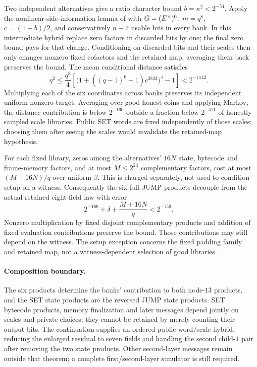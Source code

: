 \documentclass[11pt]{article}
\begin{document}
Two independent alternatives give a ratio character bound $b=\kappa^2<2^{-54}$. Apply the nonlinear-side-information lemma of  with $G=(E^\times)^6$, $m=q^8$, $c=(1+b)/2$, and conservatively $n-7$ usable bits in every bank. In this intermediate hybrid replace zero factors in discarded bits by one; the final zero bound pays for that change. Conditioning on discarded bits and their scales then only changes nonzero fixed cofactors and the retained map; averaging them back preserves the bound. The mean conditional distance satisfies
\[
 \eta^2\le\frac{q^8}{4}
 \left[\bigl(1+((q-1)^6-1)c^{3833}\bigr)^4-1\right]
 <2^{-1142}.
\]
Multiplying each of the six coordinates across banks preserves its independent uniform nonzero target. Averaging over good honest coins and applying Markov, the distance contribution is below $2^{-160}$ outside a fraction below $2^{-411}$ of honestly sampled scale libraries. Public SET words are fixed independently of those scales; choosing them after seeing the scales would invalidate the retained-map hypothesis.

For each fixed library, zeros among the alternatives' $16N$ state, bytecode and frame-memory factors, and at most $M\le2^{24}$ complementary factors, cost at most $(M+16N)/q$ over uniform $\beta$. This is charged separately, not used to condition setup on a witness. Consequently the six full JUMP products decouple from the actual retained eight-field law with error
\[
 2^{-160}+\delta+\frac{M+16N}{q}<2^{-159}.
\]
Nonzero multiplication by fixed disjoint complementary products and addition of fixed evaluation contributions preserve the bound. Those contributions may still depend on the witness. The setup exception concerns the fixed padding family and retained map, not a witness-dependent selection of good libraries.

\paragraph{Composition boundary.} The six products determine the banks' contribution to both node-$13$ products, and the SET state products are the reversed JUMP state products. SET bytecode products, memory finalization and later messages depend jointly on scales and private choices; they cannot be retained by merely counting their output bits. The continuation  supplies an ordered public-word/scale hybrid, reducing the enlarged residual to seven fields and handling the second child-$1$ pair after removing the two state products. Other second-layer messages remain outside that theorem; a complete first/second-layer simulator is still required.
\end{document}
